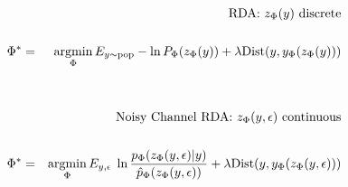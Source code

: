 {

\begin{eqnarray*}
& & \mbox{RDA: $z_\Phi(y)$ discrete} \\
\\
\Phi^* & = & \operatorname*{argmin}_\Phi E_{y \sim \mathrm{pop}} - \ln P_\Phi(z_\Phi(y)) + \lambda \mathrm{Dist}(y,y_\Phi(z_\Phi(y))) \\
\\
\\
& & \mbox{Noisy Channel RDA: $z_\Phi(y,\epsilon)$ continuous} \\
\\
\Phi^* & = & \operatorname*{argmin}_\Phi E_{y,\epsilon}\;\ln \frac{p_\Phi(z_\Phi(y,\epsilon)|y)}{\hat{p}_\Phi(z_\Phi(y,\epsilon))}
+ \lambda \mathrm{Dist}(y,y_\Phi(z_\Phi(y,\epsilon)))
\end{eqnarray*}


}

